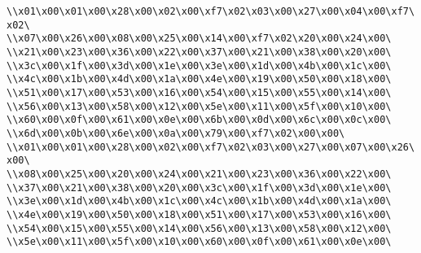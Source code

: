 \verb|\\x01\x00\x01\x00\x28\x00\x02\x00\xf7\x02\x03\x00\x27\x00\x04\x00\xf7\x02\|\newline
\verb|\\x07\x00\x26\x00\x08\x00\x25\x00\x14\x00\xf7\x02\x20\x00\x24\x00\|\newline
\verb|\\x21\x00\x23\x00\x36\x00\x22\x00\x37\x00\x21\x00\x38\x00\x20\x00\|\newline
\verb|\\x3c\x00\x1f\x00\x3d\x00\x1e\x00\x3e\x00\x1d\x00\x4b\x00\x1c\x00\|\newline
\verb|\\x4c\x00\x1b\x00\x4d\x00\x1a\x00\x4e\x00\x19\x00\x50\x00\x18\x00\|\newline
\verb|\\x51\x00\x17\x00\x53\x00\x16\x00\x54\x00\x15\x00\x55\x00\x14\x00\|\newline
\verb|\\x56\x00\x13\x00\x58\x00\x12\x00\x5e\x00\x11\x00\x5f\x00\x10\x00\|\newline
\verb|\\x60\x00\x0f\x00\x61\x00\x0e\x00\x6b\x00\x0d\x00\x6c\x00\x0c\x00\|\newline
\verb|\\x6d\x00\x0b\x00\x6e\x00\x0a\x00\x79\x00\xf7\x02\x00\x00\|\newline
\verb|\\x01\x00\x01\x00\x28\x00\x02\x00\xf7\x02\x03\x00\x27\x00\x07\x00\x26\x00\|\newline
\verb|\\x08\x00\x25\x00\x20\x00\x24\x00\x21\x00\x23\x00\x36\x00\x22\x00\|\newline
\verb|\\x37\x00\x21\x00\x38\x00\x20\x00\x3c\x00\x1f\x00\x3d\x00\x1e\x00\|\newline
\verb|\\x3e\x00\x1d\x00\x4b\x00\x1c\x00\x4c\x00\x1b\x00\x4d\x00\x1a\x00\|\newline
\verb|\\x4e\x00\x19\x00\x50\x00\x18\x00\x51\x00\x17\x00\x53\x00\x16\x00\|\newline
\verb|\\x54\x00\x15\x00\x55\x00\x14\x00\x56\x00\x13\x00\x58\x00\x12\x00\|\newline
\verb|\\x5e\x00\x11\x00\x5f\x00\x10\x00\x60\x00\x0f\x00\x61\x00\x0e\x00\|\newline

